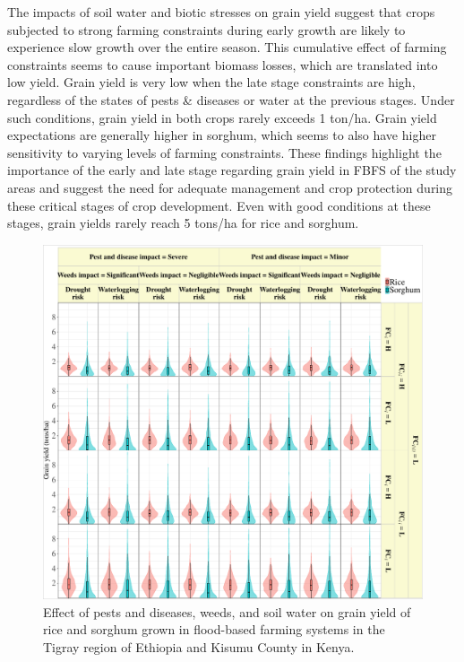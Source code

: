 \documentclass[]{elsarticle} %
\begin{document}
The impacts of soil water and biotic stresses on grain yield suggest that crops subjected to strong farming constraints during early growth are likely to experience slow growth over the entire season. This cumulative effect of farming constraints seems to cause important biomass losses, which are translated into low yield. Grain yield is very low when the late stage constraints are high, regardless of the states of pests \& diseases or water at the previous stages. Under such conditions, grain yield in both crops rarely exceeds 1 ton/ha. Grain yield expectations are generally higher in sorghum, which seems to also have higher sensitivity to varying levels of farming constraints. These findings highlight the importance of the early and late stage regarding grain yield in FBFS of the study areas and suggest the need for adequate management and crop protection during these critical stages of crop development. Even with good conditions at these stages, grain yields rarely reach 5 tons/ha for rice and sorghum.

\begin{figure}[!h]

{\centering \includegraphics[width=1\linewidth,]{figures/Modelling_FBFS_grain_yield_violin_LOW} 

}

\caption{Effect of pests and diseases, weeds, and soil water on grain yield of rice and sorghum grown in flood-based farming systems in the Tigray region of Ethiopia and Kisumu County in Kenya.}\label{fig:fig10}
\end{figure}
\end{document}
